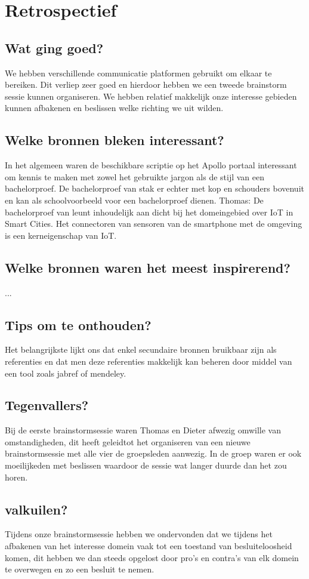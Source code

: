 \documentclass[fleqn,10pt]{voorstel}
\begin{document}
\section{Retrospectief}
\subsection{Wat ging goed?}
We hebben verschillende communicatie platformen gebruikt om elkaar te bereiken. Dit verliep zeer goed en hierdoor hebben we een tweede brainstorm sessie kunnen organiseren.
We hebben relatief makkelijk onze interesse gebieden kunnen afbakenen en beslissen welke richting we uit wilden.
\subsection{Welke bronnen bleken interessant?}
In het algemeen waren de beschikbare scriptie op het Apollo portaal interessant om kennis te maken met zowel het gebruikte jargon als de stijl van een bachelorproef. De bachelorproef van \cite{VanderPlaetsen2013} stak er echter met kop en schouders bovenuit en kan als schoolvoorbeeld voor een bachelorproef dienen.
Thomas: De bachelorproef van \cite{VanderPlaetsen2013} leunt inhoudelijk aan dicht bij het domeingebied over IoT in Smart Cities. Het connectoren van sensoren van de smartphone met de omgeving is een kerneigenschap van IoT.
\subsection{Welke bronnen waren het meest inspirerend?}
...
\subsection{Tips om te onthouden?}
Het belangrijkste lijkt ons dat enkel secundaire bronnen bruikbaar zijn als referenties en dat men deze referenties makkelijk kan beheren door middel van een tool zoals jabref of mendeley.
\subsection{Tegenvallers?}
Bij de eerste brainstormsessie waren Thomas en Dieter afwezig omwille van omstandigheden, dit heeft geleidtot het organiseren van een nieuwe brainstormsessie met alle vier de groepsleden aanwezig. In de groep waren er ook
moeilijkeden met beslissen waardoor de sessie wat langer duurde dan het zou horen.
\subsection{valkuilen?}
Tijdens onze brainstormsessie hebben we ondervonden dat we tijdens het afbakenen van het interesse domein vaak tot een toestand van besluiteloosheid komen, dit hebben we dan steeds opgelost door pro's en contra's van elk domein te overwegen en zo een besluit te nemen. 
\end{document}
